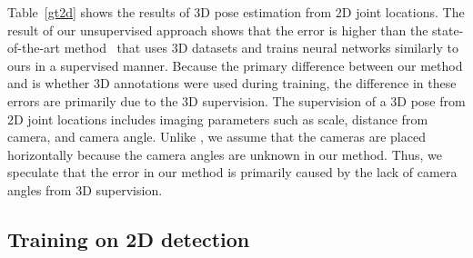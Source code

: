 \documentclass[runningheads]{llncs}
\newcommand{\Tref}[1]{Table~\ref{#1}}
\begin{document}
\Tref{gt2d} shows the results of 3D pose estimation from 2D joint locations.
The result of our unsupervised approach shows that the error is higher than the state-of-the-art method~\cite{martinez20173dbaseline} that uses 3D datasets and trains neural networks similarly to ours in a supervised manner.
Because the primary difference between our method and \cite{martinez20173dbaseline} is whether 3D annotations were used during training, the difference in these errors are primarily due to the 3D supervision.
The supervision of a 3D pose from 2D joint locations includes imaging parameters such as scale, distance from camera, and camera angle.
Unlike \cite{martinez20173dbaseline}, we assume that the cameras are placed horizontally because the camera angles are unknown in our method.
Thus, we speculate that the error in our method is primarily caused by the lack of camera angles from 3D supervision.

\subsection{Training on 2D detection}
\end{document}
